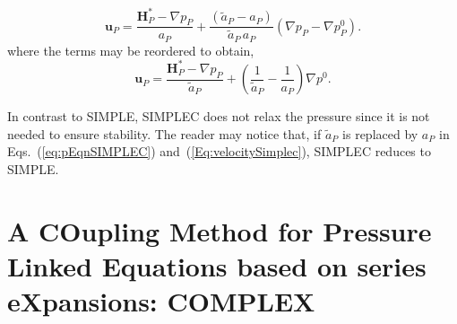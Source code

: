 \documentclass[final,3p,times,11pt,onecolumn]{myElsarticle}
\numberwithin{equation}{section}
\begin{document}
\begin{equation}
\label{eq:uCorrSIMPLEC}
\boldsymbol{u}_P 
=
\dfrac
{
\boldsymbol{H}_P^*
- 
\nabla p_P}
{a_P}
+
\dfrac
{
\left(
\tilde{a}_P
-
a_P
\right)
}
{
\tilde{a}_P\,a_P
}
\left(
\nabla p_P
-
\nabla p_P^{0}
\right).
\end{equation}
where the terms may be reordered to obtain,
\begin{equation}
\label{Eq:velocitySimplec}
\boldsymbol{u}_P 
=
\dfrac
{
\boldsymbol{H}_P^*
- 
\nabla p_P}
{\tilde{a}_P}
+
\left(
\dfrac{1}
{\tilde{a}_P}
-
\dfrac{1}
{a_P}
\right)
\nabla p^{0}.
\end{equation}

In contrast to SIMPLE, SIMPLEC does not relax the pressure since it is not needed to ensure stability. The reader may notice that, if $\tilde{a}_P$ is replaced by $a_P$ in Eqs.~(\ref{eq:pEqnSIMPLEC}) and~(\ref{Eq:velocitySimplec}), SIMPLEC reduces to SIMPLE. 

\section{A COupling Method for Pressure Linked Equations based on series eXpansions: COMPLEX}
\label{sec:COMPLEX}
\end{document}
